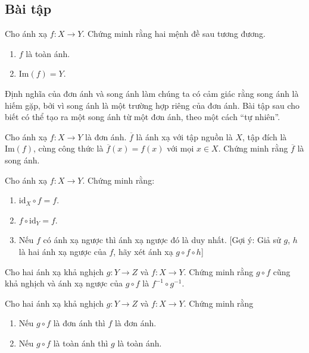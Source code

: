\subsection{Bài tập}
\setcounter{exercise}{0}

\begin{exercise}
    Cho ánh xạ $f: X\to Y$. Chứng minh rằng hai mệnh đề sau tương đương.
    \begin{enumerate}[label={(\roman*)},itemsep=0pt]
        \item $f$ là toàn ánh.
        \item $\text{Im}(f) = Y$.
    \end{enumerate}
\end{exercise}

Định nghĩa của đơn ánh và song ánh làm chúng ta có cảm giác rằng song ánh là hiếm gặp, bởi vì song ánh là một trường hợp riêng của đơn ánh. Bài tập sau cho biết có thể tạo ra một song ánh từ một đơn ánh, theo một cách ``tự nhiên''.

\begin{exercise}
    Cho ánh xạ $f: X\to Y$ là đơn ánh. $\overline{f}$ là ánh xạ với tập nguồn là $X$, tập đích là $\text{Im}(f)$, cùng công thức là $\overline{f}(x) = f(x)$ với mọi $x\in X$. Chứng minh rằng $\overline{f}$ là song ánh.
\end{exercise}

\begin{exercise}
    Cho ánh xạ $f: X\to Y$. Chứng minh rằng:
    \begin{enumerate}[label={(\roman*)}]
        \item $\text{id}_{X} \circ f = f$.
        \item $f \circ \text{id}_{Y} = f$.
        \item Nếu $f$ có ánh xạ ngược thì ánh xạ ngược đó là duy nhất. [Gợi ý: Giả sử $g$, $h$ là hai ánh xạ ngược của $f$, hãy xét ánh xạ $g\circ f\circ h$]
    \end{enumerate}
\end{exercise}

\begin{exercise}
    Cho hai ánh xạ khả nghịch $g: Y\to Z$ và $f: X\to Y$. Chứng minh rằng $g\circ f$ cũng khả nghịch và ánh xạ ngược của $g\circ f$ là $f^{-1}\circ g^{-1}$.
\end{exercise}

\begin{exercise}
    Cho hai ánh xạ khả nghịch $g: Y\to Z$ và $f: X\to Y$. Chứng minh rằng
    \begin{enumerate}[label={(\roman*)}]
        \item Nếu $g\circ f$ là đơn ánh thì $f$ là đơn ánh.
        \item Nếu $g\circ f$ là toàn ánh thì $g$ là toàn ánh.
    \end{enumerate}
\end{exercise}

